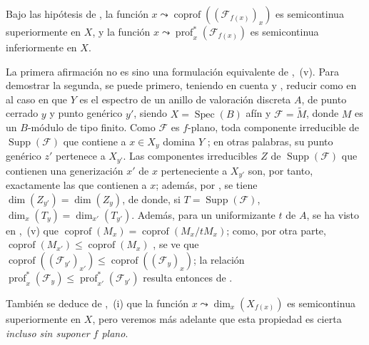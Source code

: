 \begin{corollary}[12.1.3]
\label{IV.12.1.3}
Bajo las hipótesis de , la función $x\leadsto\operatorname{coprof}((\mathcal F_{f(x)})_x)$ es semicontinua superiormente en $X$, y la función $x\leadsto\operatorname{prof}_x^*(\mathcal F_{f(x)})$  es semicontinua inferiormente en $X$.
\end{corollary}

La primera afirmación no es sino una formulación equivalente de ,~(v).
Para demostrar la segunda, se puede primero, teniendo en cuenta  y , reducir como en  al caso en que $Y$ es el espectro de un anillo de valoración discreta $A$, de punto cerrado $y$ y punto genérico $y'$, siendo $X=\operatorname{Spec}(B)$ afín y $\mathcal F=\widetilde M$, donde $M$ es un $B$-módulo de tipo finito.
Como $\mathcal F$ es $f$-plano, toda componente irreducible de $\operatorname{Supp}(\mathcal F)$ que contiene a $x\in X_y$ domina $Y$ ; en otras palabras, su punto genérico $z'$ pertenece a $X_{y'}$. Las componentes irreducibles $Z$ de $\operatorname{Supp}(\mathcal F)$ que contienen una generización $x'$ de $x$ perteneciente a $X_{y'}$ son, por tanto, exactamente las que contienen a $x$; además, por , se tiene $\dim(Z_{y'})=\dim(Z_y)$, de donde, si $T=\operatorname{Supp}(\mathcal F)$, $\dim_x(T_y)=\dim_{x'}(T_{y'})$.
Además, para un uniformizante $t$ de $A$, se ha visto en ,~(v) que $\operatorname{coprof}(M_x)=\operatorname{coprof}(M_x/tM_x)$; como, por otra parte, $\operatorname{coprof}(M_{x'})\leq\operatorname{coprof}(M_x)$ , se ve que $\operatorname{coprof}((\mathcal F_{y'})_{x'})\leq
\operatorname{coprof}((\mathcal F_y)_x)$; la relación $\operatorname{prof}_x^*(\mathcal F_y)\leq
\operatorname{prof}_{x'}^*(\mathcal F_{y'})$ resulta entonces de .

\begin{remark}[12.1.4]
\label{IV.12.1.4}
También se deduce de ,~(i) que la función $x\leadsto\dim_x(X_{f(x)})$ es semicontinua superiormente en $X$, pero veremos más adelante  que esta propiedad es cierta \emph{incluso sin suponer $f$ plano}.
\end{remark}

